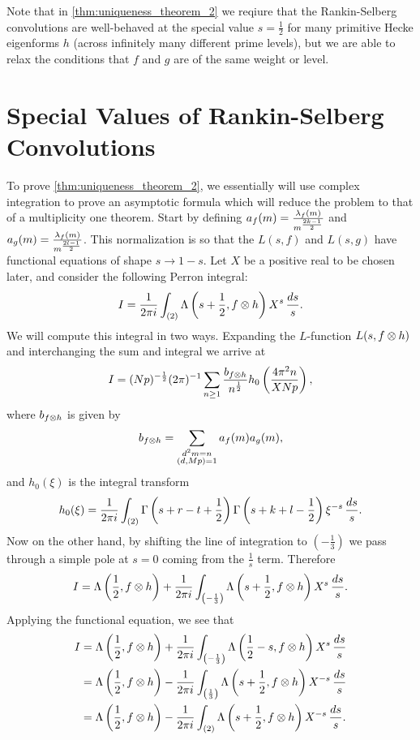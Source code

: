 \documentclass[12pt,reqno,oneside]{amsart}
\begin{document}
    Note that in \cref{thm:uniqueness_theorem_2} we reqiure that the Rankin-Selberg convolutions are well-behaved at the special value $s = \frac{1}{2}$ for many primitive Hecke eigenforms $h$ (across infinitely many different prime levels), but we are able to relax the conditions that $f$ and $g$ are of the same weight or level.
\section{Special Values of Rankin-Selberg Convolutions}
    To prove \cref{thm:uniqueness_theorem_2}, we essentially will use complex integration to prove an asymptotic formula which will reduce the problem to that of a multiplicity one theorem. Start by defining $a_{f}(m) = \frac{\lambda_{f}(m)}{m^{\frac{2k-1}{2}}}$ and $a_{g}(m) = \frac{\lambda_{f}(m)}{m^{\frac{2l-1}{2}}}$. This normalization is so that the $L(s,f)$ and $L(s,g)$ have functional equations of shape $s \to 1-s$. Let $X$ be a positive real to be chosen later, and consider the following Perron integral:
    \[
        I = \frac{1}{2\pi i}\int_{(2)}\Lambda\left(s+\frac{1}{2},f \otimes h\right)X^{s}\,\frac{ds}{s}.
    \]
    We will compute this integral in two ways. Expanding the $L$-function $L(s,f \otimes h)$ and interchanging the sum and integral we arrive at
    \begin{equation}\label{equ:I_evaulation_1}
        I = (Np)^{-\frac{1}{2}}(2\pi)^{-1}\sum_{n \ge 1}\frac{b_{f \otimes h}}{n^{\frac{1}{2}}}h_{0}\left(\frac{4\pi^{2}n}{XNp}\right),
    \end{equation}
    where $b_{f \otimes h}$ is given by
    \[
        b_{f \otimes h} = \sum_{\substack{d^{2}m = n \\ (d,Mp) = 1}}a_{f}(m)a_{g}(m),
    \]
    and $h_{0}(\xi)$ is the integral transform
    \[
        h_{0}(\xi) = \frac{1}{2\pi i}\int_{(2)}\Gamma\left(s+r-t+\frac{1}{2}\right)\Gamma\left(s+k+l-\frac{1}{2}\right)\xi^{-s}\,\frac{ds}{s}.
    \]
    Now on the other hand, by shifting the line of integration to $\left(-\frac{1}{3}\right)$ we pass through a simple pole at $s = 0$ coming from the $\frac{1}{s}$ term. Therefore
    \[
        I = \Lambda\left(\frac{1}{2},f \otimes h\right)+\frac{1}{2\pi i}\int_{\left(-\frac{1}{3}\right)}\Lambda\left(s+\frac{1}{2},f \otimes h\right)X^{s}\,\frac{ds}{s}.
    \]
    Applying the functional equation, we see that
    \begin{equation}\label{equ:I_evaulation_2}
        \begin{aligned}
            I &= \Lambda\left(\frac{1}{2},f \otimes h\right)+\frac{1}{2\pi i}\int_{\left(-\frac{1}{3}\right)}\Lambda\left(\frac{1}{2}-s,f \otimes h\right)X^{s}\,\frac{ds}{s} \\
            &= \Lambda\left(\frac{1}{2},f \otimes h\right)-\frac{1}{2\pi i}\int_{\left(\frac{1}{3}\right)}\Lambda\left(s+\frac{1}{2},f \otimes h\right)X^{-s}\,\frac{ds}{s} \\
            &= \Lambda\left(\frac{1}{2},f \otimes h\right)-\frac{1}{2\pi i}\int_{(2)}\Lambda\left(s+\frac{1}{2},f \otimes h\right)X^{-s}\,\frac{ds}{s}.
        \end{aligned}
    \end{equation}
\end{document}
